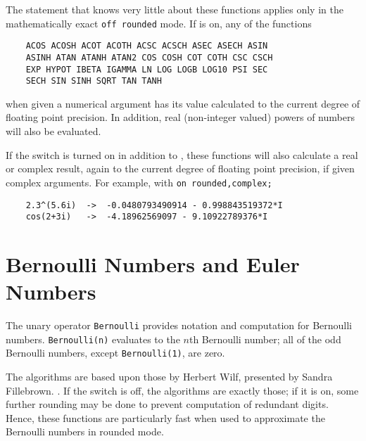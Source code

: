 The statement that {\REDUCE} knows very little about these functions
applies only in the mathematically exact \texttt{off rounded} mode.  If
 is on, any of the functions
\begin{verbatim}
    ACOS ACOSH ACOT ACOTH ACSC ACSCH ASEC ASECH ASIN
    ASINH ATAN ATANH ATAN2 COS COSH COT COTH CSC CSCH
    EXP HYPOT IBETA IGAMMA LN LOG LOGB LOG10 PSI SEC
    SECH SIN SINH SQRT TAN TANH
\end{verbatim}
when given a numerical argument has its value calculated to the current
degree of floating point precision.  In addition, real (non-integer
valued) powers of numbers will also be evaluated.

If the  switch is turned on in addition to ,
these functions will also calculate a real or complex result, again to
the current degree of floating point precision,
if given complex arguments.  For example, with \texttt{on rounded,complex;}
\begin{verbatim}
    2.3^(5.6i)  ->  -0.0480793490914 - 0.998843519372*I
    cos(2+3i)   ->  -4.18962569097 - 9.10922789376*I
\end{verbatim}

\section{Bernoulli Numbers and Euler Numbers}
\hypertarget{operator:BERNOULLI}{}
\hypertarget{operator:EULER}{}

The unary operator \texttt{Bernoulli} provides notation and computation for
Bernoulli numbers.  \texttt{Bernoulli(n)} evaluates to the $n$th Bernoulli
number; all of the odd Bernoulli numbers, except \texttt{Bernoulli(1)}, are
zero.

The algorithms are based upon those by Herbert Wilf, presented by Sandra
Fillebrown.%
 \cite{Fillebrown:92}.  
If the  switch is off,
the algorithms are exactly those; if it is on, some further rounding may
be done to prevent computation of redundant digits.  Hence, these
functions are particularly fast when used to approximate the Bernoulli
numbers in rounded mode.

